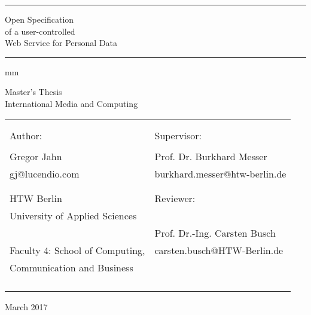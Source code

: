 \begin{titlepage}
    \begin{centering}
        \hrule\par\rule[-0.65em]{0pt}{2.8em}
        {\Huge Open Specification \\ of a user-controlled \\ Web Service for Personal Data \\ \(\ \)}
        \hrule\par\rule{0pt}{1.35em}
         mm
        \begin{Large} Master’s Thesis \\ International Media and Computing \\
        \end{Large}
    \end{centering}
    \vskip 35mm
    \begin{table}[h]\centering
        \begin{tabularx}{1.1\textwidth}{ X X }
                                            &  \\
                                            &  \\
            Author:                         & Supervisor:                   \\
            \tiny                           & \tiny                         \\
            Gregor Jahn                     & Prof. Dr. Burkhard Messer     \\
            gj@lucendio.com                 & burkhard.messer@htw-berlin.de \\
                                            &  \\
                                            &  \\
            HTW Berlin                      & Reviewer:                     \\
            University of Applied Sciences  &                               \\
                                            & Prof. Dr.-Ing. Carsten Busch  \\
            Faculty 4: School of Computing, & carsten.busch@HTW-Berlin.de   \\
            Communication and Business      &  \\
                                            &  \\
                                            &  \\
                                            &  \\
                                            &  \\
        \end{tabularx}
    \end{table}
    \begin{center}March 2017\end{center}
\end{titlepage}
